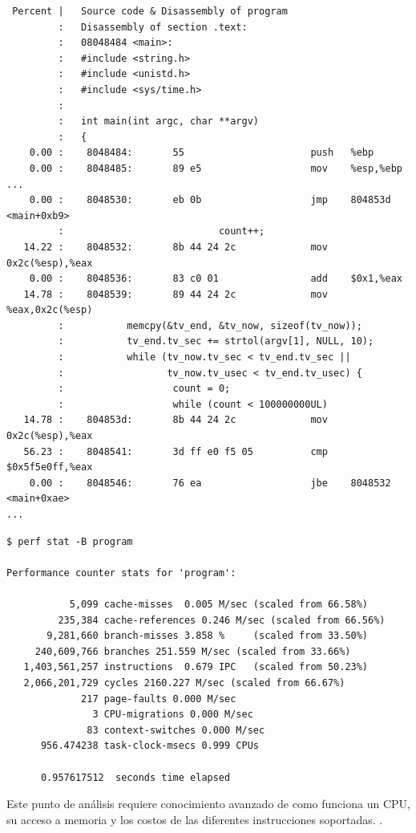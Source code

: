 \documentclass[a4paper]{report}
\begin{document}
\begin{lstlisting}
 Percent |   Source code & Disassembly of program
         :   Disassembly of section .text:
         :   08048484 <main>:
         :   #include <string.h>
         :   #include <unistd.h>
         :   #include <sys/time.h>
         :
         :   int main(int argc, char **argv)
         :   {
    0.00 :    8048484:       55                      push   %ebp
    0.00 :    8048485:       89 e5                   mov    %esp,%ebp
...
    0.00 :    8048530:       eb 0b                   jmp    804853d <main+0xb9>
         :                           count++;
   14.22 :    8048532:       8b 44 24 2c             mov    0x2c(%esp),%eax
    0.00 :    8048536:       83 c0 01                add    $0x1,%eax
   14.78 :    8048539:       89 44 24 2c             mov    %eax,0x2c(%esp)
         :           memcpy(&tv_end, &tv_now, sizeof(tv_now));
         :           tv_end.tv_sec += strtol(argv[1], NULL, 10);
         :           while (tv_now.tv_sec < tv_end.tv_sec ||
         :                  tv_now.tv_usec < tv_end.tv_usec) {
         :                   count = 0;
         :                   while (count < 100000000UL)
   14.78 :    804853d:       8b 44 24 2c             mov    0x2c(%esp),%eax
   56.23 :    8048541:       3d ff e0 f5 05          cmp    $0x5f5e0ff,%eax
    0.00 :    8048546:       76 ea                   jbe    8048532 <main+0xae>
...
\end{lstlisting}

\begin{lstlisting}
$ perf stat -B program

Performance counter stats for 'program':

           5,099 cache-misses  0.005 M/sec (scaled from 66.58%)
         235,384 cache-references 0.246 M/sec (scaled from 66.56%)
       9,281,660 branch-misses 3.858 %     (scaled from 33.50%)
     240,609,766 branches 251.559 M/sec (scaled from 33.66%)
   1,403,561,257 instructions  0.679 IPC   (scaled from 50.23%)
   2,066,201,729 cycles 2160.227 M/sec (scaled from 66.67%)
             217 page-faults 0.000 M/sec
               3 CPU-migrations 0.000 M/sec
              83 context-switches 0.000 M/sec
      956.474238 task-clock-msecs 0.999 CPUs

      0.957617512  seconds time elapsed
\end{lstlisting}

Este punto de análisis requiere conocimiento avanzado de como funciona un CPU, su acceso a memoria y los costos de las diferentes instrucciones soportadas. \cite{hennessy} \cite{intel-optimization}.
\end{document}
